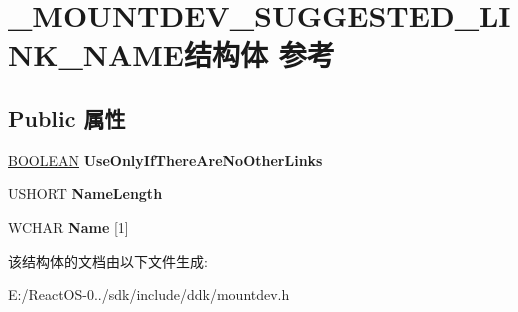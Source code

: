 \hypertarget{struct___m_o_u_n_t_d_e_v___s_u_g_g_e_s_t_e_d___l_i_n_k___n_a_m_e}{}\section{\+\_\+\+M\+O\+U\+N\+T\+D\+E\+V\+\_\+\+S\+U\+G\+G\+E\+S\+T\+E\+D\+\_\+\+L\+I\+N\+K\+\_\+\+N\+A\+M\+E结构体 参考}
\label{struct___m_o_u_n_t_d_e_v___s_u_g_g_e_s_t_e_d___l_i_n_k___n_a_m_e}
\subsection*{Public 属性}
\begin{DoxyCompactItemize}
\item 
\mbox{\label{struct___m_o_u_n_t_d_e_v___s_u_g_g_e_s_t_e_d___l_i_n_k___n_a_m_e_ac70a5a7d9a8d947edadb2e9b2e2113d1}} 
\hyperlink{_processor_bind_8h_a112e3146cb38b6ee95e64d85842e380a}{B\+O\+O\+L\+E\+AN} {\bfseries Use\+Only\+If\+There\+Are\+No\+Other\+Links}
\item 
\mbox{\label{struct___m_o_u_n_t_d_e_v___s_u_g_g_e_s_t_e_d___l_i_n_k___n_a_m_e_a6e674eb578f398b46d3074c6ac8d09b9}} 
U\+S\+H\+O\+RT {\bfseries Name\+Length}
\item 
\mbox{\label{struct___m_o_u_n_t_d_e_v___s_u_g_g_e_s_t_e_d___l_i_n_k___n_a_m_e_a5f65601887f4fcd1de0aa7c1e0d172bd}} 
W\+C\+H\+AR {\bfseries Name} \mbox{[}1\mbox{]}
\end{DoxyCompactItemize}


该结构体的文档由以下文件生成\+:\begin{DoxyCompactItemize}
\item 
E\+:/\+React\+O\+S-\/0../sdk/include/ddk/mountdev.\+h\end{DoxyCompactItemize}
